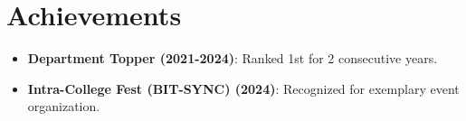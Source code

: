 \documentclass[12pt, letterpaper]{article}
\begin{document}
\section{Achievements}
\begin{itemize}[leftmargin=*]
    \item \faCertificate \textbf{Department Topper (2021-2024)}: Ranked 1st for 2 consecutive years.
    \item \faTrophy \textbf{Intra-College Fest (BIT-SYNC) (2024)}: Recognized for exemplary event organization.
\end{itemize}
\end{document}
